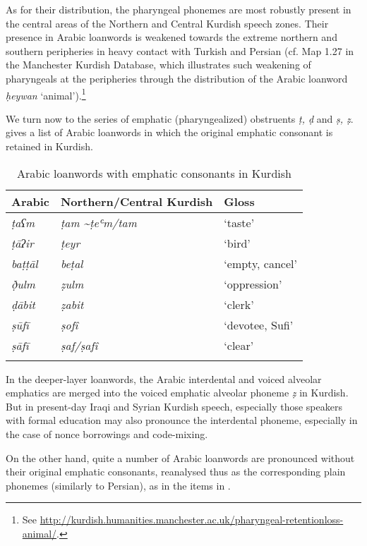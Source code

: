\documentclass[output=paper]{langsci/langscibook}
\begin{document}
As for their distribution, the pharyngeal phonemes are most robustly present in the central areas of the Northern and Central Kurdish speech zones. Their presence in Arabic loanwords is weakened towards the extreme northern and southern peripheries in heavy contact with Turkish and Persian (cf. Map 1.27 in the Manchester Kurdish Database, which illustrates such weakening of pharyngeals at the peripheries through the distribution of the Arabic loanword \textit{ḥeywan} ‘animal’).\footnote{See \url{http://kurdish.humanities.manchester.ac.uk/pharyngeal-retentionloss-animal/}.}

We turn now to the series of emphatic (pharyngealized) obstruents \textit{ṭ, ḍ} and \textit{ṣ, ẓ}.  gives a list of Arabic loanwords in which the original emphatic consonant is retained in Kurdish. 

\begin{table}
\begin{tabular}{lll}
\lsptoprule
Arabic & Northern/Central Kurdish & Gloss\\\midrule
\textit{ṭaʕm}   & \textit{ṭam \textasciitilde ṭeʿm\slash tam} & ‘taste’\\ 
\textit{ṭāʔir}  & \textit{ṭeyr}                               & ‘bird’\\ 
\textit{baṭṭāl} & \textit{beṭal}                              & ‘empty, cancel’\\ 
\textit{ð̣ulm}  & \textit{ẓulm}                               & ‘oppression’\\ 
\textit{ḍābit}  & \textit{ẓabit}                              & ‘clerk’\\ 
\textit{ṣūfī}   & \textit{ṣofî}                               & ‘devotee, Sufi’\\ 
\textit{ṣāfī}   & \textit{ṣaf/ṣafî}                           & ‘clear’\\
\lspbottomrule
\end{tabular}
\caption{Arabic loanwords with emphatic consonants in Kurdish\label{tab:opengin:5}}
\end{table}

In the deeper-layer loanwords, the Arabic interdental and voiced alveolar emphatics are merged into the voiced emphatic alveolar phoneme \textit{ẓ} in Kurdish. But in present-day Iraqi and Syrian Kurdish speech, especially those speakers with formal education may also pronounce the interdental phoneme, especially in the case of nonce borrowings and code-mixing.  

On the other hand, quite a number of Arabic loanwords are pronounced without their original emphatic consonants, reanalysed thus as the corresponding plain phonemes (similarly to Persian), as in the items in . 
\end{document}
